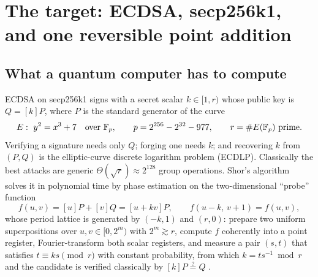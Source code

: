 \section{The target: ECDSA, secp256k1, and one reversible point addition}\label{sec:target}

\subsection{What a quantum computer has to compute}

ECDSA on secp256k1 signs with a secret scalar $k\in[1,r)$ whose public key is $Q=[k]P$, where $P$ is the standard generator of the curve
\[
E:\ y^2=x^3+7 \quad\text{over } \F_p,\qquad p=2^{256}-2^{32}-977,\qquad r=\#E(\F_p)\ \text{prime}.
\]
Verifying a signature needs only $Q$; forging one needs $k$; and recovering $k$ from $(P,Q)$ is the elliptic-curve discrete logarithm problem (ECDLP). Classically the best attacks are generic $\Theta(\sqrt r)\approx2^{128}$ group operations. Shor's algorithm \cite{shor97,proos-zalka03} solves it in polynomial time by phase estimation on the two-dimensional ``probe'' function
\begin{equation}\label{eq:probe}
f(u,v)=[u]P+[v]Q=[u+kv]P,\qquad f(u-k,\,v+1)=f(u,v),
\end{equation}
whose period lattice is generated by $(-k,1)$ and $(r,0)$: prepare two uniform superpositions over $u,v\in[0,2^m)$ with $2^m\gtrsim r$, compute $f$ coherently into a point register, Fourier-transform both scalar registers, and measure a pair $(s,t)$ that satisfies $t\equiv ks\pmod r$ with constant probability, from which $k=ts^{-1}\bmod r$ and the candidate is verified classically by $[k]P\overset{?}{=}Q$ \cite{ekera19}.

